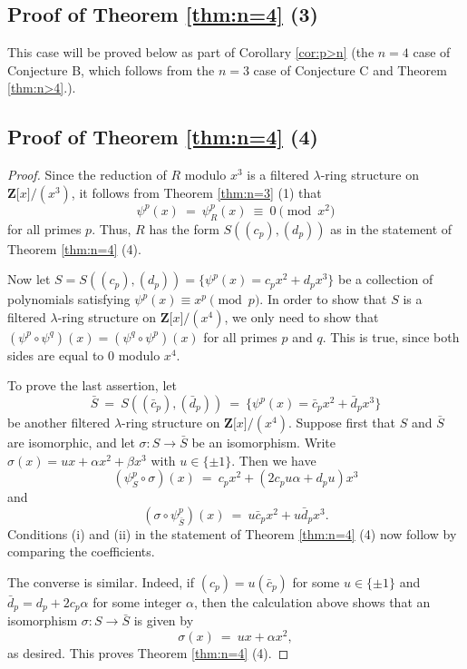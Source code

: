 \documentclass[reqno,11pt]{amsart}
\numberwithin{equation}{subsection}  %
\newcommand{\bZ}{\mathbf{Z}}
\begin{document}

\subsection{Proof of Theorem \ref{thm:n=4} (3)}
\label{subsec:n=4 (3)}
This case will be proved below as part of Corollary \ref{cor:p>n} (the $n = 4$ case of Conjecture B, which follows from the $n = 3$ case of Conjecture C and Theorem \ref{thm:n>4}.).



\subsection{Proof of Theorem \ref{thm:n=4} (4)}
\begin{proof}
Since the reduction of $R$ modulo $x^3$ is a filtered $\lambda$-ring structure on $\bZ \lbrack x \rbrack/(x^3)$, it follows from Theorem \ref{thm:n=3} (1) that 
   \[
   \psi^p(x) ~=~ \psi^p_R(x) ~\equiv~ 0 \pmod{x^2}
   \]
for all primes $p$.  Thus, $R$ has the form $S((c_p), (d_p))$ as in the statement of Theorem \ref{thm:n=4} (4).


Now let $S = S((c_p), (d_p)) = \lbrace \psi^p(x) = c_p x^2 + d_p x^3 \rbrace$ be a collection of polynomials satisfying $\psi^p(x) \equiv x^p \pmod{p}$.  In order to show that $S$ is a filtered $\lambda$-ring structure on $\bZ \lbrack x \rbrack/(x^4)$, we only need to show that $(\psi^p \circ \psi^q)(x) = (\psi^q \circ \psi^p)(x)$ for all primes $p$ and $q$.  This is true, since both sides are equal to $0$ modulo $x^4$.


To prove the last assertion, let 
   \[
   \bar{S} ~=~ S((\bar{c}_p), (\bar{d}_p)) ~=~ \lbrace \psi^p(x) = \bar{c}_p x^2 + \bar{d}_p x^3 \rbrace
   \]
be another filtered $\lambda$-ring structure on $\bZ \lbrack x \rbrack/(x^4)$.  Suppose first that $S$ and $\bar{S}$ are isomorphic, and let $\sigma \colon S \to \bar{S}$ be an isomorphism.  Write $\sigma(x) = ux + \alpha x^2 + \beta x^3$ with $u \in \lbrace \pm 1 \rbrace$.  Then we have
   \[
   (\psi^p_S \circ \sigma)(x) 
   ~=~ c_p x^2 + (2c_p u\alpha + d_p u)x^3
   \]
and
   \[
   (\sigma \circ \psi^p_{\bar{S}})(x)
   ~=~ u\bar{c}_p x^2 + u\bar{d}_p x^3.
   \]
Conditions (i) and (ii) in the statement of Theorem \ref{thm:n=4} (4) now follow by comparing the coefficients.  


The converse is similar.  Indeed, if $(c_p) = u(\bar{c}_p)$ for some $u \in \lbrace \pm 1 \rbrace$ and $\bar{d}_p = d_p + 2c_p \alpha$ for some integer $\alpha$, then the calculation above shows that an isomorphism $\sigma \colon S \to \bar{S}$ is given by
   \[
   \sigma(x) ~=~ ux + \alpha x^2,
   \]
as desired. This proves Theorem \ref{thm:n=4} (4).
\end{proof}
\end{document}
